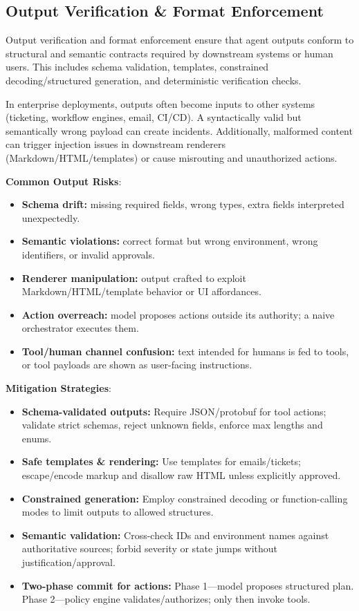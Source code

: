\begin{TNtwocol}
    \section{Output Verification & Format Enforcement}

    Output verification and format enforcement ensure that agent outputs conform to structural and semantic contracts required by downstream systems or human users. This includes schema validation, templates, constrained decoding/structured generation, and deterministic verification checks.

    In enterprise deployments, outputs often become inputs to other systems (ticketing, workflow engines, email, CI/CD). A syntactically valid but semantically wrong payload can create incidents. Additionally, malformed content can trigger injection issues in downstream renderers (Markdown/HTML/templates) or cause misrouting and unauthorized actions.

    \textbf{Common Output Risks}:
    \begin{itemize}
        \item \textbf{Schema drift:} missing required fields, wrong types, extra fields interpreted unexpectedly.
        \item \textbf{Semantic violations:} correct format but wrong environment, wrong identifiers, or invalid approvals.
        \item \textbf{Renderer manipulation:} output crafted to exploit Markdown/HTML/template behavior or UI affordances.
        \item \textbf{Action overreach:} model proposes actions outside its authority; a naive orchestrator executes them.
        \item \textbf{Tool/human channel confusion:} text intended for humans is fed to tools, or tool payloads are shown as user-facing instructions.
    \end{itemize}

    \textbf{Mitigation Strategies}:
    \begin{itemize}
        \item \textbf{Schema-validated outputs:} Require JSON/protobuf for tool actions; validate strict schemas, reject unknown fields, enforce max lengths and enums.
        \item \textbf{Safe templates \& rendering:} Use templates for emails/tickets; escape/encode markup and disallow raw HTML unless explicitly approved.
        \item \textbf{Constrained generation:} Employ constrained decoding or function-calling modes to limit outputs to allowed structures.
        \item \textbf{Semantic validation:} Cross-check IDs and environment names against authoritative sources; forbid severity or state jumps without justification/approval.
        \item \textbf{Two-phase commit for actions:} Phase 1—model proposes structured plan. Phase 2—policy engine validates/authorizes; only then invoke tools.
    \end{itemize}


\end{TNtwocol}
